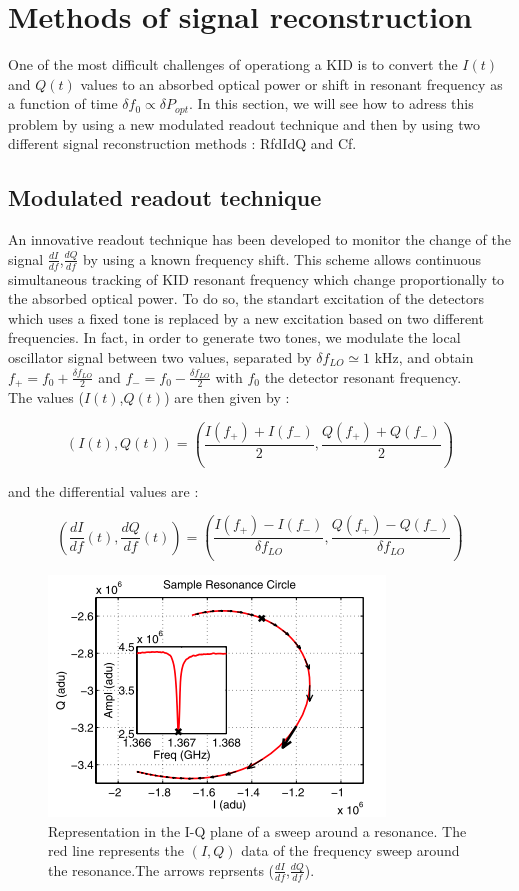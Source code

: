 \section{Methods of signal reconstruction}
One of the most difficult challenges of operationg a KID is to convert the $I(t)$ and $Q(t)$ values to an absorbed optical power or shift in resonant frequency as a function of time $\delta f_{0} \propto \delta P_{opt}$. In this section, we will see how to adress this problem by using a new modulated readout technique and then by using two different signal reconstruction methods : RfdIdQ and Cf.

\subsection{Modulated readout technique}
An innovative readout technique has been developed to monitor the change of the signal $\frac{dI}{df}$,$\frac{dQ}{df}$ by using a known frequency shift. This scheme allows continuous simultaneous tracking of KID resonant frequency which change proportionally to the absorbed optical power. To do so, the standart excitation of the detectors which uses a fixed tone is replaced by a new excitation based on two different frequencies. In fact, in order to generate two tones, we modulate the local oscillator signal between two values, separated by $\delta f_{LO} \simeq 1$ kHz, and obtain $f_{+} = f_{0} + \frac{\delta f_{LO}}{2}$ and $f_{-} = f_{0} - \frac{\delta f_{LO}}{2}$ with $f_{0}$ the detector resonant frequency.\\
The values ($I(t)$,$Q(t)$) are then given by :

\begin{equation}
(I(t),Q(t)) = (\frac{I(f_{+}) + I(f_{-})}{2}, \frac{Q(f_{+}) + Q(f_{-})}{2})
\end{equation}

and the differential values are :

\begin{equation}
\label{gradient}
(\frac{dI}{df}(t),\frac{dQ}{df}(t)) = (\frac{I(f_{+}) - I(f_{-})}{\delta f_{LO}}, \frac{Q(f_{+}) - Q(f_{-})}{\delta f_{LO}})
\end{equation}

\begin{figure}[h]
\center
	\includegraphics[scale=0.5]{resonance-circle.png}
	\caption{Representation in the I-Q plane of a sweep around a resonance. The red line represents the $(I,Q)$ data of the frequency sweep around the resonance.The arrows reprsents ($\frac{dI}{df}$,$\frac{dQ}{df}$). \citep{2013A&A...551L..12C}}
	\label{circle-iq}
\end{figure}

